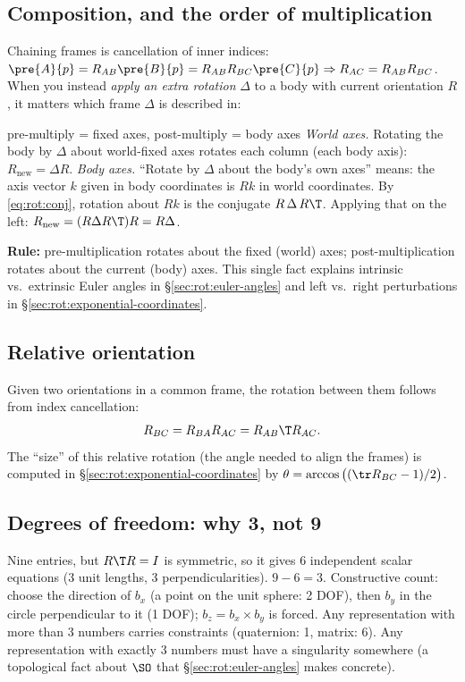 \subsection{Composition, and the order of multiplication}\label{sec:rot:composition-order-multiplication}
Chaining frames is cancellation of inner indices: $\pre{A}{p}=R_{AB}\pre{B}{p}=R_{AB}R_{BC}\pre{C}{p}\Rightarrow R_{AC}=R_{AB}R_{BC}$. When you instead \emph{apply an extra rotation} $\Delta$ to a body with current orientation $R$, it matters which frame $\Delta$ is described in:
\begin{deriv}{pre-multiply = fixed axes, post-multiply = body axes}
\emph{World axes.} Rotating the body by $\Delta$ about world-fixed axes rotates each column (each body axis): $R_{\text{new}}=\Delta R$.
\emph{Body axes.} ``Rotate by $\Delta$ about the body's own axes'' means: the axis vector $k$ given in body coordinates is $Rk$ in world coordinates. By \eqref{eq:rot:conj}, rotation about $Rk$ is the conjugate $R\,\Delta\,R\T$. Applying that on the left: $R_{\text{new}}=(R\Delta R\T)R=R\Delta$.
\end{deriv}
\textbf{Rule:} pre-multiplication rotates about the fixed (world) axes; post-multiplication rotates about the current (body) axes. This single fact explains intrinsic vs.\ extrinsic Euler angles in \S\ref{sec:rot:euler-angles} and left vs.\ right perturbations in \S\ref{sec:rot:exponential-coordinates}.

\subsection{Relative orientation}\label{sec:rot:relative-orientation}
Given two orientations in a common frame, the rotation between them follows from index cancellation:
\[
R_{BC}=R_{BA}R_{AC}=R_{AB}\T R_{AC}.
\]
The ``size'' of this relative rotation (the angle needed to align the frames) is computed in \S\ref{sec:rot:exponential-coordinates} by $\theta=\arccos\big((\tr R_{BC}-1)/2\big)$.

\subsection{Degrees of freedom: why 3, not 9}\label{sec:rot:degrees-freedom-3}
Nine entries, but $R\T R=I$ is symmetric, so it gives $6$ independent scalar equations (3 unit lengths, 3 perpendicularities). $9-6=3$. Constructive count: choose the direction of $b_x$ (a point on the unit sphere: 2 DOF), then $b_y$ in the circle perpendicular to it (1 DOF); $b_z=b_x\times b_y$ is forced. Any representation with more than 3 numbers carries constraints (quaternion: 1, matrix: 6). Any representation with exactly 3 numbers must have a singularity somewhere (a topological fact about $\SO$ that \S\ref{sec:rot:euler-angles} makes concrete).

